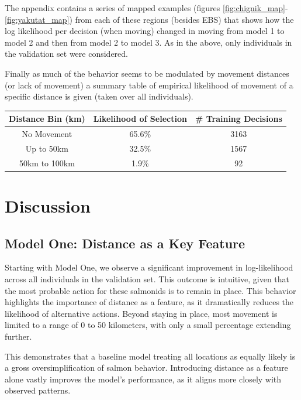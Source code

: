 \documentclass[11pt]{article}
\begin{document}
The appendix contains a series of mapped examples (figures \ref{fig:chignik_map}-\ref{fig:yakutat_map}) from each of these regions (besides EBS) that shows how the log likelihood per decision (when moving) changed in moving from model 1 to model 2 and then from model 2 to model 3. As in the above, only individuals in the validation set were considered.\newline

Finally as much of the behavior seems to be modulated by movement distances (or lack of movement) a summary table of empirical likelihood of movement of a specific distance is given (taken over all individuals). 

\begin{center}
\begin{tabular}{| c | c | c |}
\hline
Distance Bin (km) & Likelihood of Selection & \# Training Decisions \\
\hline
No Movement & 65.6\% & 3163 \\
Up to 50km & 32.5\% & 1567 \\
50km to 100km & 1.9\% & 92 \\
\hline

\end{tabular}
\end{center}


\section*{Discussion}

\subsection*{Model One: Distance as a Key Feature}
Starting with Model One, we observe a significant improvement in log-likelihood across all individuals in the validation set. This outcome is intuitive, given that the most probable action for these salmonids is to remain in place. This behavior highlights the importance of distance as a feature, as it dramatically reduces the likelihood of alternative actions. Beyond staying in place, most movement is limited to a range of 0 to 50 kilometers, with only a small percentage extending further.

This demonstrates that a baseline model treating all locations as equally likely is a gross oversimplification of salmon behavior. Introducing distance as a feature alone vastly improves the model’s performance, as it aligns more closely with observed patterns.
\end{document}
